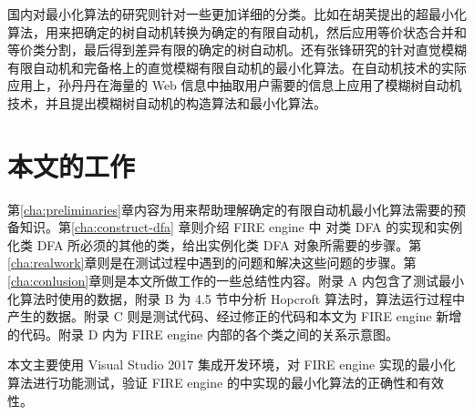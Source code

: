 国内对最小化算法的研究则针对一些更加详细的分类。比如在胡芙提出的超最小化算法，用来把确定的树自动机转换为确定的有限自动机，然后应用等价状态合并和等价类分割，最后得到差异有限的确定的树自动机\cite{hfTreeFA}。还有张锋研究的针对直觉模糊有限自动机和完备格上的直觉模糊有限自动机的最小化算法\cite{zf14Min}。在自动机技术的实际应用上，孙丹丹在海量的 Web 信息中抽取用户需要的信息上应用了模糊树自动机技术，并且提出模糊树自动机的构造算法和最小化算法\cite{sdd14}。 

\section{本文的工作}

第\ref{cha:preliminaries}章内容为用来帮助理解确定的有限自动机最小化算法需要的预备知识。第\ref{cha:construct-dfa} 章则介绍 FIRE engine 中 对类 DFA 的实现和实例化类 DFA 所必须的其他的类，给出实例化类 DFA 对象所需要的步骤。第\ref{cha:realwork}章则是在测试过程中遇到的问题和解决这些问题的步骤。第\ref{cha:conlusion}章则是本文所做工作的一些总结性内容。附录 A 内包含了测试最小化算法时使用的数据，附录 B 为 4.5 节中分析 Hopcroft 算法时，算法运行过程中产生的数据。附录 C 则是测试代码、经过修正的代码和本文为 FIRE engine 新增的代码。附录 D 内为 FIRE engine 内部的各个类之间的关系示意图。

本文主要使用 Visual Studio 2017 集成开发环境，对 FIRE engine 实现的最小化算法进行功能测试，验证 FIRE engine 的中实现的最小化算法的正确性和有效性。